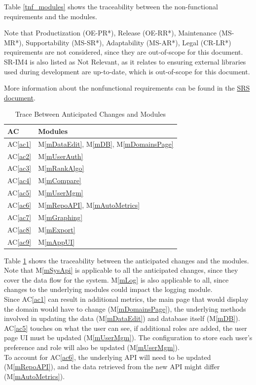 \documentclass[12pt, titlepage]{article}
\newcommand{\acref}[1]{AC\ref{#1}}
\newcommand{\mref}[1]{M\ref{#1}}
\begin{document}
Table \ref{tnf_modules} shows the traceability between the non-functional requirements and the modules.

Note that Productization (OE-PR*), Release (OE-RR*), Maintenance (MS-MR*), Supportability (MS-SR*), Adaptability (MS-AR*), Legal (CR-LR*) requirements are not considered, since they are out-of-scope for this document. \\
SR-IM4 is also listed as Not Relevant, as it relates to ensuring external libraries used during development are up-to-date, which is out-of-scope for this document.

More information about the nonfunctional requirements can be found in the \href{https://github.com/thaafei/DomainX/blob/main/docs/SRS/SRS.pdf}{SRS document}.
\begin{table}[H]
\centering
\begin{tabular}{p{} p{}}
\toprule
\textbf{AC} & \textbf{Modules}\\
\midrule
\acref{ac1} & \mref{mDataEdit}, \mref{mDB}, \mref{mDomainsPage}\\
\acref{ac2} & \mref{mUserAuth}\\
\acref{ac3} & \mref{mRankAlgo}\\
\acref{ac4} & \mref{mCompare}\\
\acref{ac5} & \mref{mUserMgm}\\
\acref{ac6} & \mref{mRepoAPI}, \mref{mAutoMetrics}\\
\acref{ac7} & \mref{mGraphing}\\
\acref{ac8} & \mref{mExport}\\
\acref{ac9} & \mref{mAppUI}\\
\bottomrule
\end{tabular}
\caption{Trace Between Anticipated Changes and Modules}
\label{TblACT}
\end{table}
Table \ref{TblACT} shows the traceability between the anticipated changes and the modules. \\
Note that \mref{mSysApi} is applicable to all the anticipated changes, since they cover the data flow for the system.
\mref{mLog} is also applicable to all, since changes to the underlying modules could impact the logging module.
\\ Since \acref{ac1} can result in additional metrics, the main page that would display the domain would have to change (\mref{mDomainsPage}), the underlying methods involved in updating the data (\mref{mDataEdit}) and database itself (\mref{mDB}).
\\ \acref{ac5} touches on what the user can see, if additional roles are added, the user page UI must be updated (\mref{mUserMgm}). The configuration to store each user's preference and role will also be updated (\mref{mUserMgm}).
\\ To account for \acref{ac6}, the underlying API will need to be updated (\mref{mRepoAPI}), and the data retrieved from the new API might differ (\mref{mAutoMetrics}).
\end{document}
